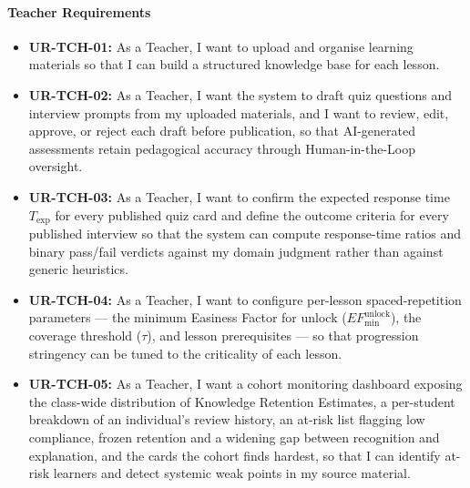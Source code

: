 \paragraph{Teacher Requirements}
\begin{itemize}
    \item \textbf{UR-TCH-01:} As a Teacher, I want to upload and organise learning materials so that I can build a structured knowledge base for each lesson.
    \item \textbf{UR-TCH-02:} As a Teacher, I want the system to draft quiz questions and interview prompts from my uploaded materials, and I want to review, edit, approve, or reject each draft before publication, so that AI-generated assessments retain pedagogical accuracy through Human-in-the-Loop oversight.
    \item \textbf{UR-TCH-03:} As a Teacher, I want to confirm the expected response time $T_{\exp}$ for every published quiz card and define the outcome criteria for every published interview so that the system can compute response-time ratios and binary pass/fail verdicts against my domain judgment rather than against generic heuristics.
    \item \textbf{UR-TCH-04:} As a Teacher, I want to configure per-lesson spaced-repetition parameters --- the minimum Easiness Factor for unlock ($EF_{\min}^{\text{unlock}}$), the coverage threshold ($\tau$), and lesson prerequisites --- so that progression stringency can be tuned to the criticality of each lesson.
    \item \textbf{UR-TCH-05:} As a Teacher, I want a cohort monitoring dashboard exposing the class-wide distribution of Knowledge Retention Estimates, a per-student breakdown of an individual's review history, an at-risk list flagging low compliance, frozen retention and a widening gap between recognition and explanation, and the cards the cohort finds hardest, so that I can identify at-risk learners and detect systemic weak points in my source material.
\end{itemize}

